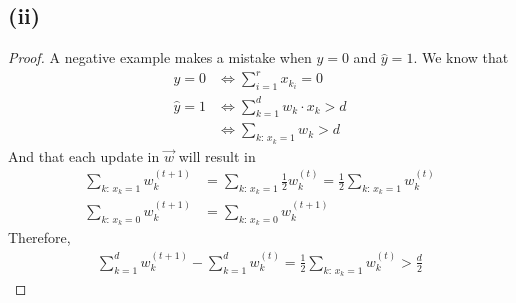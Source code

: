 \documentclass[twoside,11pt]{homework}
\begin{document}
\subsection*{(ii)}
	\begin{proof}
		A negative example makes a mistake when $y=0$ and $\hat{y}=1$. We know that
		\begin{align*}
			y=0 &\Longleftrightarrow \sum_{i=1}^{r}x_{k_i} = 0 \\
			\hat{y}=1 &\Longleftrightarrow \sum_{k=1}^{d} w_k \cdot x_{k} > d \\
			&\Longleftrightarrow \sum_{k: \,x_k=1} w_k  > d
		\end{align*}
		And that each update in $\vec{w}$ will result in
		\begin{align*}
			\sum_{k: \,x_k=1} w_k^{(t+1)}  &= \sum_{k: \,x_k=1} \frac{1}{2}w_k^{(t)}
			= \frac{1}{2} \sum_{k: \,x_k=1} w_k^{(t)}  \\
			\sum_{k: \,x_k=0} w_k^{(t+1)}& = \sum_{k: \,x_k=0} w_k^{(t+1)}
		\end{align*}
		Therefore,
		\begin{align*}
			\sum_{k=1}^d w_k^{(t+1)}-\sum_{k=1}^d w_k^{(t)}  
			= \frac{1}{2} \sum_{k: \,x_k=1} w_k^{(t)}
			> \frac{d}{2}
		\end{align*}
	\end{proof}
\end{document}
